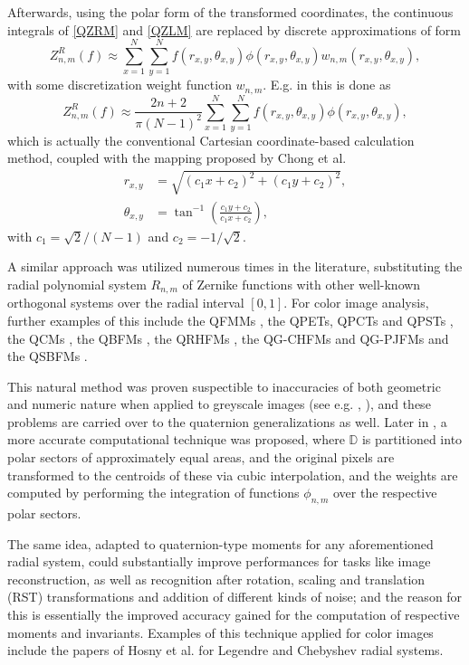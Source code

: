 \documentclass[12pt]{article}
\newcommand{\D}{\mathbb{D}}
\begin{document}
Afterwards, using the polar form of the transformed coordinates, the continuous integrals of \eqref{QZRM} and \eqref{QZLM} are replaced by discrete approximations of form
\[
	Z_{n,m}^R(f) \approx \sum_{x=1}^N \sum_{y=1}^N f(r_{x,y},\theta_{x,y}) \phi(r_{x,y},\theta_{x,y}) w_{n,m}(r_{x,y},\theta_{x,y}),
\]
with some discretization weight function $w_{n,m}$. E.g. in \cite{ChenOriginal} this is done as
\[
	Z_{n,m}^R(f) \approx \frac{2n+2}{\pi (N-1)^2}  \sum_{x=1}^N \sum_{y=1}^N f(r_{x,y},\theta_{x,y}) \phi(r_{x,y},\theta_{x,y}),
\]
which is actually the conventional Cartesian coordinate-based calculation method, coupled with the mapping proposed by Chong et al. \cite{Chong}
\[
\begin{split}
	r_{x,y} &= \sqrt{(c_1x + c_2)^2 + (c_1y + c_2)^2}, \\
	\theta_{x,y} &= \tan^{-1}\left(\frac{c_1y + c_2}{c_1x + c_2}\right),
\end{split}
\]
with $c_1=\sqrt{2}/(N-1)$ and $c_2=-1/\sqrt{2}$. 

A similar approach was utilized numerous times in the literature, substituting the radial polynomial system $R_{n,m}$ of Zernike functions with other well-known orthogonal systems over the radial interval $[0,1]$. For color image analysis, further examples of this include the QFMMs \cite{GuoZhu}, the QPETs, QPCTs and QPSTs \cite{Li}, the QCMs \cite{Guo}, the QBFMs \cite{Shao}, the QRHFMs \cite{Wang}, the QG-CHFMs and QG-PJFMs \cite{Singh} and the QSBFMs \cite{Yang}.

This natural method was proven suspectible to inaccuracies of both geometric and numeric nature when applied to greyscale images (see e.g.  \cite{LiaoPawlak}, \cite{PawlakLiao}), and these problems are carried over to the quaternion generalizations as well. Later in \cite{Xin}, a more accurate computational technique was proposed, where $\D$ is partitioned into polar sectors of approximately equal areas, and the original pixels are transformed to the centroids of these via cubic interpolation, and the weights are computed by performing the integration of functions $\phi_{n,m}$ over the respective polar sectors. 

The same idea, adapted to quaternion-type moments for any aforementioned radial system, could substantially improve performances for tasks like image reconstruction, as well as recognition after rotation, scaling and translation (RST) transformations and addition of different kinds of noise; and the reason for this is essentially the improved accuracy gained for the computation of respective moments and invariants. Examples of this technique applied for color images include the papers of Hosny et al. for Legendre \cite{HosnyLegendre} and Chebyshev \cite{HosnyChebyshev} radial systems.
\end{document}
